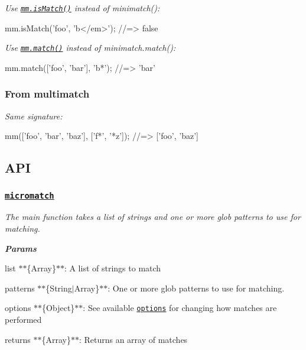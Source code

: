 {\itshape Use \href{#ismatch}{\tt mm.\+is\+Match()} instead of {\ttfamily minimatch()}\+:}

{\itshape 
\begin{DoxyCode}
mm.isMatch('foo', 'b</em>');
//=> false
\end{DoxyCode}
}

{\itshape Use \href{#match}{\tt mm.\+match()} instead of {\ttfamily minimatch.\+match()}\+:}

{\itshape 
\begin{DoxyCode}
mm.match(['foo', 'bar'], 'b*');
//=> 'bar'
\end{DoxyCode}
}

{\itshape \subsubsection*{From multimatch}}

{\itshape }

{\itshape Same signature\+:}

{\itshape 
\begin{DoxyCode}
mm(['foo', 'bar', 'baz'], ['f*', '*z']);
//=> ['foo', 'baz']
\end{DoxyCode}
}

{\itshape \subsection*{A\+PI}}

{\itshape }

{\itshape \subsubsection*{\href{index.js#L41}{\tt micromatch}}}

{\itshape }

{\itshape The main function takes a list of strings and one or more glob patterns to use for matching.}

{\itshape {\bfseries Params}}

{\itshape 
\begin{DoxyItemize}
\item {\ttfamily list} $\ast$$\ast$\{Array\}$\ast$$\ast$\+: A list of strings to match
\item {\ttfamily patterns} $\ast$$\ast$\{String$\vert$\+Array\}$\ast$$\ast$\+: One or more glob patterns to use for matching.
\item {\ttfamily options} $\ast$$\ast$\{Object\}$\ast$$\ast$\+: See available \href{#options}{\tt options} for changing how matches are performed
\item {\ttfamily returns} $\ast$$\ast$\{Array\}$\ast$$\ast$\+: Returns an array of matches
\end{DoxyItemize}}

